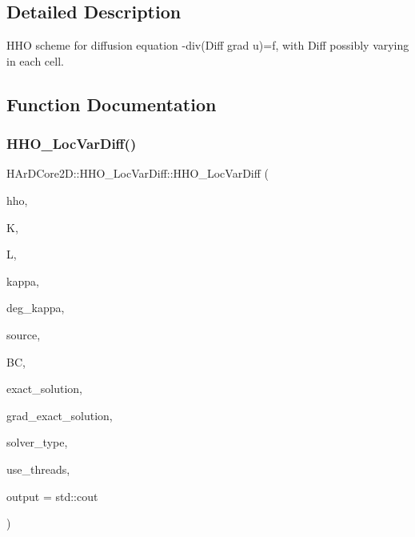 \subsection{Detailed Description}
H\+HO scheme for diffusion equation -\/div(Diff grad u)=f, with Diff possibly varying in each cell. 



\subsection{Function Documentation}
\mbox{\label{group__HHO__LocVarDiff_ga82ef4509a6352116618e6753b5440e1d}} 
\subsubsection{\texorpdfstring{H\+H\+O\+\_\+\+Loc\+Var\+Diff()}{HHO\_LocVarDiff()}}
{\footnotesize\ttfamily H\+Ar\+D\+Core2\+D\+::\+H\+H\+O\+\_\+\+Loc\+Var\+Diff\+::\+H\+H\+O\+\_\+\+Loc\+Var\+Diff (\begin{DoxyParamCaption}\item[{\hyperlink{classHArDCore2D_1_1HybridCore}{Hybrid\+Core} \&}]{hho,  }\item[{size\+\_\+t}]{K,  }\item[{int}]{L,  }\item[{\hyperlink{classHArDCore2D_1_1HHO__LocVarDiff_ab9add9590d4d5b4193799e917c8d746b}{tensor\+\_\+function\+\_\+type}}]{kappa,  }\item[{size\+\_\+t}]{deg\+\_\+kappa,  }\item[{\hyperlink{classHArDCore2D_1_1HHO__LocVarDiff_a5a85ff6ce87c2247d4a4af57b070320d}{source\+\_\+function\+\_\+type}}]{source,  }\item[{\hyperlink{classBoundaryConditions}{Boundary\+Conditions}}]{BC,  }\item[{\hyperlink{classHArDCore2D_1_1HHO__LocVarDiff_ae1c9d7cb11a0b31461d4c19c3b7a7aab}{solution\+\_\+function\+\_\+type}}]{exact\+\_\+solution,  }\item[{\hyperlink{classHArDCore2D_1_1HHO__LocVarDiff_ae0ce0c1a88fe08ddd972cbed5a9e4837}{grad\+\_\+function\+\_\+type}}]{grad\+\_\+exact\+\_\+solution,  }\item[{std\+::string}]{solver\+\_\+type,  }\item[{bool}]{use\+\_\+threads,  }\item[{std\+::ostream \&}]{output = {\ttfamily std\+:\+:cout} }\end{DoxyParamCaption})}



